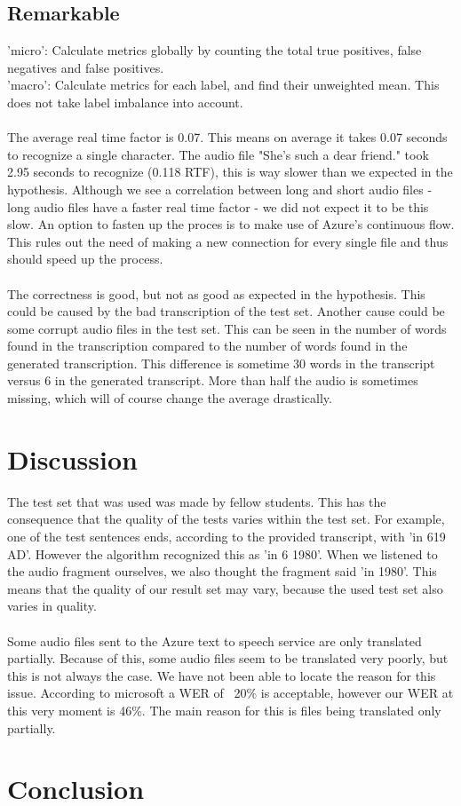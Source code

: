 \documentclass{article}
\begin{document}
\subsection{Remarkable}
    'micro': Calculate metrics globally by counting the total true positives, false negatives and false positives. \\
    'macro': Calculate metrics for each label, and find their unweighted mean. This does not take label imbalance into account. \\ \\
    The average real time factor is 0.07. This means on average it takes 0.07 seconds to recognize a single character. The audio file "She's such a dear friend." took 2.95 seconds to recognize (0.118 RTF), this is way slower than we expected in the hypothesis. Although we see a correlation between long and short audio files - long audio files have a faster real time factor - we did not expect it to be this slow. An option to fasten up the proces is to make use of Azure's continuous flow. This rules out the need of making a new connection for every single file and thus should speed up the process. \\ \\
    The correctness is good, but not as good as expected in the hypothesis. This could be caused by the bad transcription of the test set. 
    Another cause could be some corrupt audio files in the test set. This can be seen in the number of words found in the transcription compared to the number of words found in the generated transcription. This difference is sometime 30 words in the transcript versus 6 in the generated transcript. More than half the audio is sometimes missing, which will of course change the average drastically. 
    
\section{Discussion}
The test set that was used was made by fellow students. This has the consequence that the quality of the tests varies within the test set. For example, one of the test sentences ends, according to the provided transcript, with 'in 619 AD'. However the algorithm recognized this as 'in 6 1980'. When we listened to the audio fragment ourselves, we also thought the fragment said 'in 1980'. This means that the quality of our result set may vary, because the used test set also varies in quality. \\ \\
Some audio files sent to the Azure text to speech service are only translated partially. Because of this, some audio files seem to be translated very poorly, but this is not always the case. We have not been able to locate the reason for this issue. According to microsoft\cite{Accuracyt2s} a WER of ~20\% is acceptable, however our WER at this very moment is 46\%. The main reason for this is files being translated only partially.

\section{Conclusion}


 
 
\end{document}
